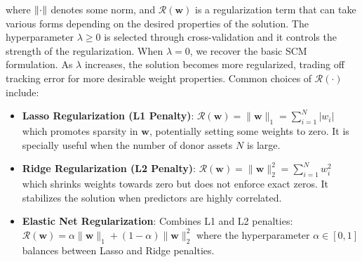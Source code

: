 where $\lVert\cdot\rVert$ denotes some norm, and $\mathcal{R}(\mathbf{w})$ is a regularization term that can take various forms depending on the desired properties of the solution. 
The hyperparameter $\lambda \geq 0$ is selected through cross-validation and it controls the strength of the regularization. When $\lambda = 0$, we recover the basic SCM formulation. As $\lambda$ increases, the solution becomes more regularized, trading off tracking error for more desirable weight properties.
Common choices of $\mathcal R(\cdot)$ include:

\begin{itemize}
    \item \textbf{Lasso Regularization (L1 Penalty)}:
    $
    \mathcal{R}(\mathbf{w}) = \| \mathbf{w} \|_1 = \sum_{i=1}^{N} |w_i|
    $
which promotes sparsity in $ \mathbf{w} $, potentially setting some weights to zero. It is specially useful when the number of donor assets $ N $ is large.

    \item \textbf{Ridge Regularization (L2 Penalty)}:
    $
    \mathcal{R}(\mathbf{w}) = \| \mathbf{w} \|_2^2 = \sum_{i=1}^{N} w_i^2
    $
which shrinks weights towards zero but does not enforce exact zeros. It stabilizes the solution when predictors are highly correlated.

    \item \textbf{Elastic Net Regularization}:
    Combines L1 and L2 penalties:
    $
    \mathcal{R}(\mathbf{w}) = \alpha \| \mathbf{w} \|_1 + (1 - \alpha) \| \mathbf{w} \|_2^2
    $
    where the hyperparameter  $ \alpha \in [0, 1] $ balances between Lasso and Ridge penalties.
\end{itemize}



